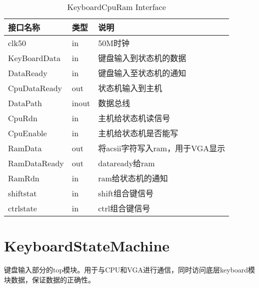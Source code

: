 \begin{center}
\renewcommand{\arraystretch}{1.3}
\small
\begin{longtable}{|p{3cm}<{\centering}|p{1.4cm}<{\centering}|p{7cm}<{\centering}|}
\caption{KeyboardCpuRam Interface}
\label{tab:treatments}\\
\hline
接口名称 & 类型 & 说明 \\
\hline
clk50 & in & 50M时钟 \\
\hline
KeyBoardData & in & 键盘输入到状态机的数据 \\
\hline
DataReady & in & 键盘输入至状态机的通知 \\
\hline
CpuDataReady & out & 状态机输入到主机 \\
\hline
DataPath & inout & 数据总线 \\
\hline
CpuRdn & in & 主机给状态机读信号 \\
\hline
CpuEnable & in & 主机给状态机是否能写\\
\hline
RamData & out & 将acsii字符写入ram，用于VGA显示\\
\hline
RamDataReady & out & dataready给ram \\
\hline
RamRdn & in & ram给状态机的通知 \\
\hline
 shiftstat & in & shift组合键信号 \\
 \hline
 ctrlstate & in & ctrl组合键信号 \\
 \hline
\end{longtable}
\end{center}


\section{KeyboardStateMachine}

键盘输入部分的top模块。用于与CPU和VGA进行通信，同时访问底层keyboard模块数据，保证数据的正确性。

